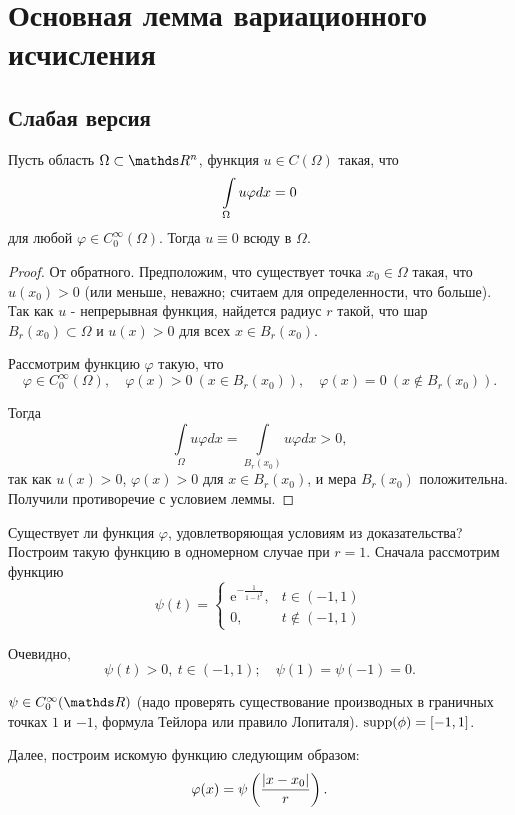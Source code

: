 \section{Основная лемма вариационного исчисления}
\subsection{Слабая версия}
\begin{lemma}
Пусть область $\Omega \subset \real^n$, функция $u \in C(\Omega)$ такая, что 
$$\displaystyle \int \limits_{\Omega} u \varphi dx = 0$$ 
для любой $\varphi \in C_0^\infty(\Omega)$. Тогда $u \equiv 0$ всюду в $\Omega$.
\end{lemma}

\begin{proof}
От обратного. Предположим, что существует точка $x_0 \in \Omega$ такая, что $u(x_0) > 0$ (или меньше, неважно; считаем для определенности, что больше). 
Так как $u$ - непрерывная функция, найдется радиус $r$ такой, что шар $B_r(x_0) \subset \Omega$ и $u(x) > 0$ для всех $x \in B_r(x_0)$.

Рассмотрим функцию $\varphi$ такую, что 
$$\varphi \in C_0^\infty(\Omega),\quad \varphi(x) > 0 \ (x \in B_r(x_0)),\quad \varphi(x) = 0 \ (x \notin B_r(x_0)).$$

Тогда
$$\int \limits_{\Omega} u \varphi dx = \int \limits_{B_r(x_0)} u \varphi dx > 0,$$ 
так как $u(x) > 0$, $\varphi(x) > 0$ для $x \in B_r(x_0)$, и мера $B_r(x_0)$ положительна. Получили противоречие с условием леммы.
\end{proof}

\begin{note}
Существует ли функция $\varphi$, удовлетворяющая условиям из доказательства? 
Построим такую функцию в одномерном случае при $r = 1$. Сначала рассмотрим функцию
$$
    \psi(t) =
        \begin{cases} 
            \mathrm{e}^{-\frac{1}{1 - t^2}}, & t \in (-1, 1) \\
            0, & t \notin (-1, 1) 
        \end{cases}
$$

Очевидно, 
$$\psi(t) > 0, \ t \in (-1, 1); \quad \psi(1) = \psi(-1) = 0.$$ 

$\psi \in C_0^\infty(\real)$ (надо проверять существование производных в граничных точках $1$ и $-1$, формула Тейлора или правило Лопиталя). 
$\operatorname{supp}(\phi) = [-1, 1]$.

Далее, построим искомую функцию следующим образом:
$$\varphi(x) = \psi \left(\frac{\lvert x - x_0\rvert}{r}\right).$$
\end{note}

